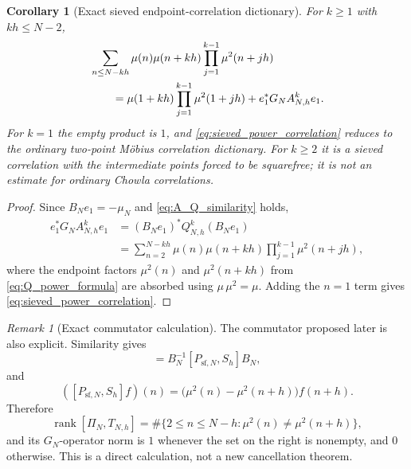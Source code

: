 \documentclass[11pt]{amsart}
\numberwithin{equation}{section}
\theoremstyle{plain}
\newtheorem{corollary}[theorem]{Corollary}
\theoremstyle{definition}
\theoremstyle{remark}
\newtheorem{remark}[theorem]{Remark}
\newcommand{\mob}{\mu}
\DeclareMathOperator{\rank}{rank}
\begin{document}
\begin{corollary}[Exact sieved endpoint-correlation dictionary]
\label{cor:sieved_power_correlation}
For $k\ge1$ with $kh\le N-2$,
\begin{align}
&\sum_{n\le N-kh}\mob(n)\mob(n+kh)
\prod_{j=1}^{k-1}\mob^2(n+jh) \notag\\
&\qquad=
\mob(1+kh)\prod_{j=1}^{k-1}\mob^2(1+jh)
+e_1^*G_NA_{N,h}^ke_1.
\label{eq:sieved_power_correlation}
\end{align}
For $k=1$ the empty product is $1$, and \eqref{eq:sieved_power_correlation} reduces to the ordinary two-point Möbius correlation dictionary.  For $k\ge2$ it is a sieved correlation with the intermediate points forced to be squarefree; it is not an estimate for ordinary Chowla correlations.
\end{corollary}

\begin{proof}
Since $B_Ne_1=-\mob_N$ and \eqref{eq:A_Q_similarity} holds,
\begin{align}
e_1^*G_NA_{N,h}^ke_1
&=(B_Ne_1)^*Q_{N,h}^k(B_Ne_1)\\
&=\sum_{n=2}^{N-kh}\mob(n)\mob(n+kh)
\prod_{j=1}^{k-1}\mob^2(n+jh),
\label{eq:sieved_power_inner_product}
\end{align}
where the endpoint factors $\mob^2(n)$ and $\mob^2(n+kh)$ from \eqref{eq:Q_power_formula} are absorbed using $\mob\,\mob^2=\mob$.  Adding the $n=1$ term gives \eqref{eq:sieved_power_correlation}.
\end{proof}

\begin{remark}[Exact commutator calculation]
\label{rem:exact_commutator}
The commutator proposed later is also explicit.  Similarity gives
\begin{equation}
[\Pi_N,T_{N,h}]=B_N^{-1}[P_{\mathrm{sf},N},S_h]B_N,
\label{eq:commutator_similarity_exact}
\end{equation}
and
\begin{equation}
([P_{\mathrm{sf},N},S_h]f)(n)
=\bigl(\mob^2(n)-\mob^2(n+h)\bigr)f(n+h).
\label{eq:commutator_pointwise_exact}
\end{equation}
Therefore
\begin{equation}
\rank[\Pi_N,T_{N,h}]
=\#\{2\le n\le N-h:\mob^2(n)\ne\mob^2(n+h)\},
\label{eq:commutator_rank_exact}
\end{equation}
and its $G_N$-operator norm is $1$ whenever the set on the right is nonempty, and $0$ otherwise.  This is a direct calculation, not a new cancellation theorem.
\end{remark}
\end{document}
